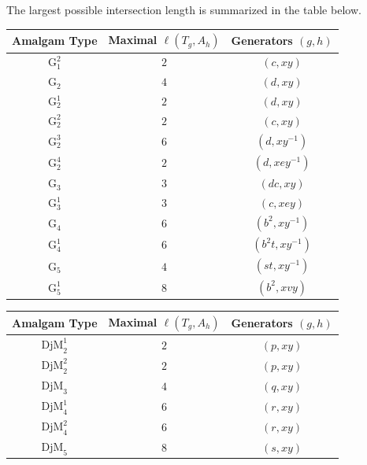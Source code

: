 \documentclass[12pt,leqno]{amsart}
\newcommand{\2}{L^2_{\rm per}(0, T)}
\numberwithin{equation}{section}
\numberwithin{figure}{section}
\begin{document}
The largest possible intersection length is summarized in the table below.
\begin{center}
    \begin{tabular}{c|c|c}
        Amalgam Type & Maximal $\ell(T_g,A_h)$ & Generators $(g,h)$ \\
        \hline
        $\mathrm{G}_1^2$ & $2$ & $(c,xy)$ \\
        $\mathrm{G}_2$ & $4$ & $(d,xy)$ \\
        $\mathrm{G}_2^1$ & $2$ & $(d,xy)$ \\
        $\mathrm{G}_2^2$ & $2$ & $(c,xy)$ \\
        $\mathrm{G}_2^3$ & $6$ & $(d,xy^{-1})$ \\
        $\mathrm{G}_2^4$ & $2$ & $(d, xey^{-1})$ \\
        $\mathrm{G}_3$ & $3$ & $(dc, xy)$ \\
        $\mathrm{G}_3^1$ & $3$ & $(c, xey)$ \\
        $\mathrm{G}_4$ & $6$ & $(b^2, xy^{-1})$\\
        $\mathrm{G}_4^1$ & $6$ & $(b^2t, xy^{-1})$\\
        $\mathrm{G}_5$ & $4$ & $(st, xy^{-1})$\\
        $\mathrm{G}_5^1$ & $8$ & $(b^2,xvy)$ \\
    \end{tabular}
\end{center}
\begin{center}
    \begin{tabular}{c|c|c}
        Amalgam Type &  Maximal $\ell(T_g,A_h)$ & Generators $(g,h)$ \\
        \hline
        $\mathrm{DjM}_2^1$ & $2$ & $(p,xy)$ \\
        $\mathrm{DjM}_2^2$ & $2$ & $(p,xy)$ \\
        $\mathrm{DjM}_3$ & $4$ & $(q,xy)$ \\
        $\mathrm{DjM}_4^1$ & $6$ & $(r,xy)$ \\
        $\mathrm{DjM}_4^2$ & $6$ & $(r,xy)$\\
        $\mathrm{DjM}_5$ & $8$ & $(s,xy)$\\
    \end{tabular}
\end{center}
{}

\end{document}
